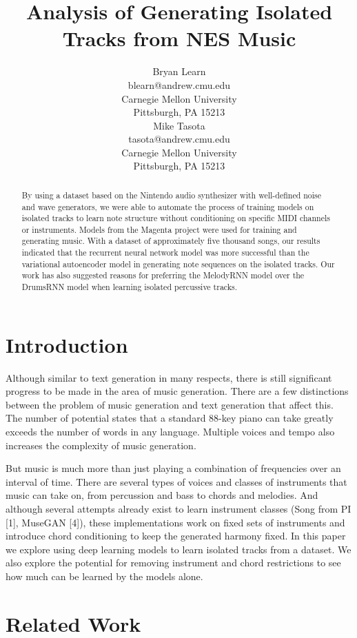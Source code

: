 \documentclass{article}
\title{Analysis of Generating Isolated Tracks from NES Music}
\author{
  Bryan Learn\\
  blearn@andrew.cmu.edu\\
  Carnegie Mellon University\\
  Pittsburgh, PA 15213\\
  \And
  Mike Tasota\\
  tasota@andrew.cmu.edu\\
  Carnegie Mellon University\\
  Pittsburgh, PA 15213\\
}
\begin{document}

\maketitle


\begin{abstract}
By using a dataset based on the Nintendo audio synthesizer with well-defined noise and wave generators, we were able to automate the process of training models on isolated tracks to learn note structure without conditioning on specific MIDI channels or instruments. Models from the Magenta project were used for training and generating music. With a dataset of approximately five thousand songs, our results indicated that the recurrent neural network model was more successful than the variational autoencoder model in generating note sequences on the isolated tracks. Our work has also suggested reasons for preferring the MelodyRNN model over the DrumsRNN model when learning isolated percussive tracks.
\end{abstract}


\section{Introduction}


Although similar to text generation in many respects, there is still significant progress to be made in the area of music generation. There are a few distinctions between the problem of music generation and text generation that affect this. The number of potential states that a standard 88-key piano can take greatly exceeds the number of words in any language. 
Multiple voices and tempo also increases the complexity of music generation.

But music is much more than just playing a combination of frequencies over an interval of time. There are several types of voices and classes of instruments that music can take on, from percussion and bass to chords and melodies. And although several attempts already exist to learn instrument classes (Song from PI [1], MuseGAN [4]), these implementations work on fixed sets of instruments and introduce chord conditioning to keep the generated harmony fixed. In this paper we explore using deep learning models to learn isolated tracks from a dataset. We also explore the potential for removing instrument and chord restrictions to see how much can be learned by the models alone.


\section{Related Work}
\end{document}
